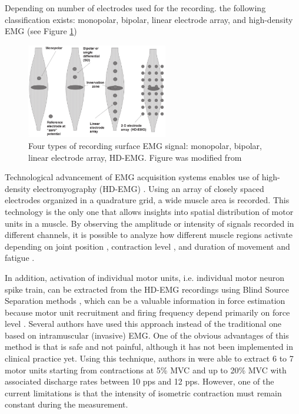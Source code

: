 Depending on number of electrodes used for the recording. the following classification exists: monopolar, bipolar, linear electrode array, and high-density EMG (see Figure \ref{fig:electrode_types})

\begin{figure}[ht]
\centering
\includegraphics[width=0.55\textwidth]{Images/introduction/electrode_types.png}
\caption{Four types of recording surface EMG signal: monopolar, bipolar, linear electrode array, HD-EMG. Figure was modified from \citep{Merletti2010}}
\label{fig:electrode_types}
\end{figure}


Technological advancement of EMG acquisition systems enables use of high-density electromyography (HD-EMG) \citep{Zwarts2004}. Using an array of closely spaced electrodes organized in a quadrature grid, a wide muscle area is recorded. This technology is the only one that allows insights into spatial distribution of motor units in a muscle. By observing the amplitude or intensity of signals recorded in different channels, it is possible to analyze how different muscle regions activate depending on joint position \citep{Vieira2010}, contraction level \citep{Holtermann2005}, and duration of movement and fatigue \citep{Tucker2009, Staudenmann2014}. 

In addition, activation of individual motor units, i.e. individual motor neuron spike train, can be extracted from the HD-EMG recordings using Blind Source Separation methods \citep{Holobar2007, Holobar2010}, which can be a valuable information in force estimation because motor unit recruitment and firing frequency depend primarily on force level \citep{Merletti-book}. Several authors have used this approach instead of the traditional one based on intramuscular (invasive) EMG. One of the obvious advantages of this method is that is safe and not painful, although it has not been implemented in clinical practice yet. Using this technique, authors in \citep{Holobar2010} were able to extract 6 to 7 motor units starting from contractions at 5\% MVC and up to 20\% MVC with associated discharge rates between 10 pps and 12 pps. However, one of the current limitations is that the intensity of isometric contraction must remain constant during the measurement.

